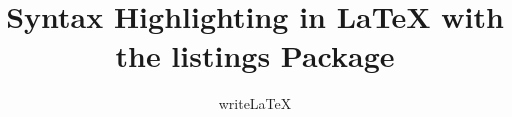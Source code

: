 \usepackage[T2A]{fontenc}			%
\usepackage[utf8]{inputenc}
\usepackage[english]{babel}	%

\usepackage{graphicx}

\setlength\parindent{0pt}

\sloppy                                    %
\linespread{1.3}                           %
\setlength{\parskip}{0.5em}                %

\usepackage{lipsum}
\usepackage{easy-todo} %
\usepackage{csquotes} %

\usepackage[activate={true,nocompatibility},
	final,
	tracking=true,
	kerning=true,
	expansion=true,
	spacing=true,
	factor=1050,
	stretch=25,
	shrink=10]{microtype} %
\usepackage{booktabs}
\usepackage{appendix}
\usepackage[rflt]{floatflt}
\usepackage{fancyvrb}
\usepackage{setspace}
\usepackage{pbox}
\usepackage{tabulary}

\hypersetup{
    pdfstartview=FitH,
    colorlinks=true,
    linkcolor=blue,
    filecolor=magenta,      
    urlcolor=cyan,
}

\usepackage{titleps}                       %


\pagestyle{main}

\sloppy                                    %
\linespread{1.3}                           %
\setlength{\parskip}{0.5em}                %

\setcounter{secnumdepth}{0}                %

\usepackage{listings}
\usepackage{color}

\title{Syntax Highlighting in LaTeX with the listings Package}
\author{writeLaTeX}


